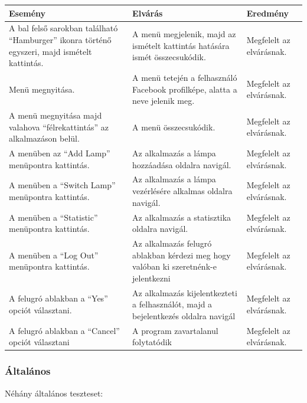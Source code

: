 \documentclass[a4paper,12pt]{report}
\begin{document}
    \begin{center}
        \begin{tabular}{ | m{4.5cm} | m{4.5cm} | m{4.5cm} |}
            \hline
            Esemény & Elvárás & Eredmény \\ \hline
            A bal felső sarokban található ``Hamburger'' ikonra történő egyszeri, majd ismételt kattintás. & A menü megjelenik, majd az ismételt kattintás
            hatására ismét összecsukódik. & Megfelelt az elvárásnak.\\ \hline
            Menü megnyitása. & A menü tetején a felhasználó Facebook profilképe, alatta a neve jelenik meg. & Megfelelt az elvárásnak.\\ \hline
            A menü megnyitása majd valahova ``félrekattintás'' az alkalmazáson belül. & A menü összecsukódik. & Megfelelt az elvárásnak.\\ \hline
            A menüben az ``Add Lamp'' menüpontra kattintás. & Az alkalmazás a lámpa hozzáadása oldalra navigál. & Megfelelt az elvárásnak.\\ \hline
            A menüben a ``Switch Lamp'' menüpontra kattintás. & Az alkalmazás a lámpa vezérlésére alkalmas oldalra navigál. & Megfelelt az elvárásnak.\\ \hline
            A menüben a ``Statistic'' menüpontra kattintás. & Az alkalmazás a statisztika oldalra navigál. & Megfelelt az elvárásnak.\\ \hline
            A menüben a ``Log Out'' menüpontra kattintás. & Az alkalmazás felugró ablakban kérdezi meg hogy valóban ki szeretnénk-e jelentkezni &
            Megfelelt az elvárásnak.\\ \hline
            A felugró ablakban a ``Yes'' opciót választani. & Az alkalmazás kijelentkezteti a felhasználót, majd a bejelentkezés oldalra navigál &
            Megfelelt az elvárásnak.\\ \hline
            A felugró ablakban a ``Cancel'' opciót választani & A program zavartalanul folytatódik & Megfelelt az elvárásnak.\\
            \hline
        \end{tabular}
    \end{center}

    \subsubsection{Általános}
    Néhány általános teszteset:
\end{document}
